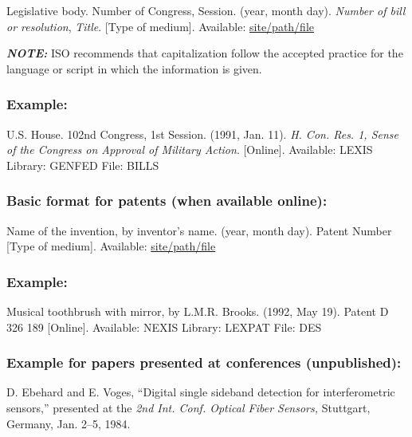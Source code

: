\documentclass{IEEEoj}
\begin{document}
\begin{thebibliography}{00}
 Legislative body. Number of Congress, Session. (year, month day). \textit{Number of bill or resolution}, \textit{Title}. [Type
of medium]. Available: \underline{site/path/file}
\end{thebibliography}

{\bfseries\itshape NOTE:} ISO recommends that capitalization follow the
accepted practice for the language or script in which the information is
given.

\subsubsection*{Example:}

\begin{thebibliography}{00}
 U.S. House. 102nd Congress, 1st Session. (1991, Jan. 11). \textit{H. Con. Res. 1, Sense of the Congress on Approval of Military Action}. [Online]. Available: LEXIS Library: GENFED File: BILLS
\end{thebibliography}

\subsubsection*{Basic format for patents (when available online):}

\begin{thebibliography}{00}
 Name of the invention, by inventor's name. (year, month day). Patent Number [Type
of medium]. Available: \underline{site/path/file}
\end{thebibliography}

\subsubsection*{Example:}

\begin{thebibliography}{00}
 Musical toothbrush with mirror, by L.M.R. Brooks. (1992, May 19). Patent D 326 189 [Online]. Available: NEXIS Library: LEXPAT File: DES
\end{thebibliography}

\subsubsection*{Example for papers presented at conferences (unpublished):}

\begin{thebibliography}{00}
 D. Ebehard and E. Voges, ``Digital single sideband
detection for interferometric sensors,'' presented at the \textit{2nd Int. Conf. Optical Fiber Sensors,} Stuttgart, Germany, Jan. 2--5, 1984.
\end{thebibliography}
\end{document}

